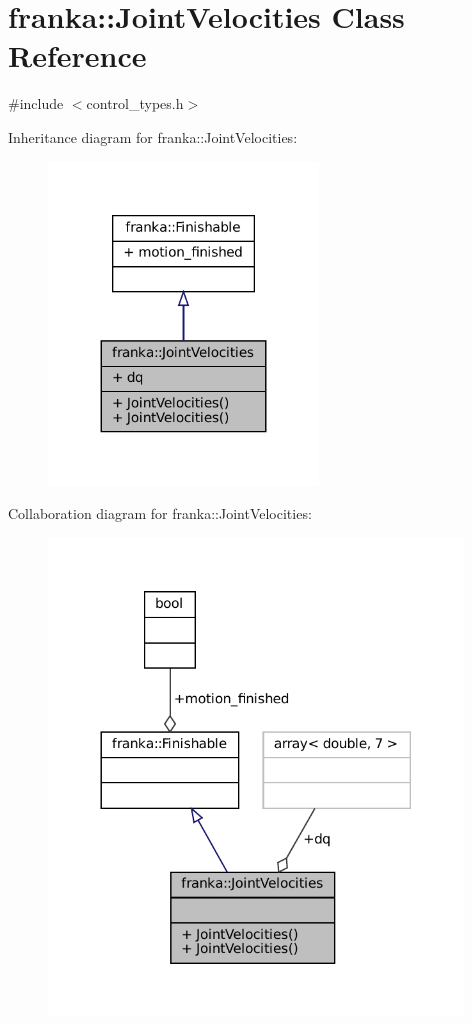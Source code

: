 \hypertarget{classfranka_1_1JointVelocities}{}\section{franka\+:\+:Joint\+Velocities Class Reference}
\label{classfranka_1_1JointVelocities}


{\ttfamily \#include $<$control\+\_\+types.\+h$>$}



Inheritance diagram for franka\+:\+:Joint\+Velocities\+:
\nopagebreak
\begin{figure}[H]
\begin{center}
\leavevmode
\includegraphics[width=203pt]{classfranka_1_1JointVelocities__inherit__graph}
\end{center}
\end{figure}


Collaboration diagram for franka\+:\+:Joint\+Velocities\+:
\nopagebreak
\begin{figure}[H]
\begin{center}
\leavevmode
\includegraphics[width=312pt]{classfranka_1_1JointVelocities__coll__graph}
\end{center}
\end{figure}
